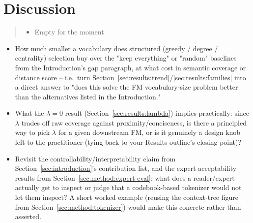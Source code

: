 \section{Discussion}
\label{sec:discussion}

\begin{quote}\small\itshape
\begin{itemize}
\item Empty for the moment
\end{itemize}
\end{quote}


\begin{itemize}
\item How much smaller a vocabulary does structured (greedy / degree /
centrality) selection buy over the "keep everything" or "random" baselines
from the Introduction's gap paragraph, at what cost in semantic coverage or
distance score -- i.e.\ turn Section~\ref{sec:results:trend}/\ref{sec:results:families}
into a direct answer to "does this solve the FM vocabulary-size problem
better than the alternatives listed in the Introduction."
\item What the $\lambda=0$ result (Section~\ref{sec:results:lambda}) implies
practically: since $\lambda$ trades off raw coverage against
proximity/conciseness, is there a principled way to pick $\lambda$ for a
given downstream FM, or is it genuinely a design knob left to the
practitioner (tying back to your Results outline's closing point)?
\item Revisit the controllability/interpretability claim from
Section~\ref{sec:introduction}'s contribution list, and the expert
acceptability results from Section~\ref{sec:method:expert-eval}: what does a
reader/expert actually get to inspect or judge that a codebook-based
tokenizer would not let them inspect? A short worked example (reusing the
context-tree figure from Section~\ref{sec:method:tokenizer}) would make this
concrete rather than asserted.
\end{itemize}
